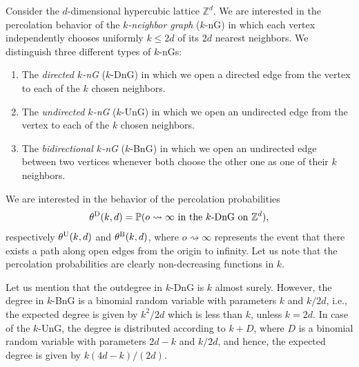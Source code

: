 \documentclass[oneside]{amsart}
\theoremstyle{definition}
\newcommand{\1}{\mathbbm{1}}
\newcommand{\0}{\mathbf{o}}
\numberwithin{equation}{section}
\begin{document}
Consider the $d$-dimensional hypercubic lattice $\mathbb Z^d$. We are interested in the percolation behavior of the {\em $k$-neighbor graph} ($k$-nG) in which each vertex independently chooses uniformly $k\le 2d$ of its $2d$ nearest neighbors. We distinguish three different types of $k$-nGs:
\begin{enumerate}
\item The {\em directed $k$-nG} ($k$-DnG) in which we open a directed edge from the vertex to each of the $k$ chosen neighbors. 
\item The {\em undirected $k$-nG} ($k$-UnG) in which we open an undirected edge from the vertex to each of the $k$ chosen neighbors.
\item The {\em bidirectional $k$-nG} ($k$-BnG) in which we open an undirected edge between two vertices whenever both choose the other one as one of their $k$ neighbors.
\end{enumerate}

We are interested in the behavior of the percolation probabilities 
\begin{equation}\label{thetaD}
\theta^{\rm D}(k,d)=\mathbb P(o\rightsquigarrow\infty \text{ in the $k$-DnG on $\mathbb Z^d$}),
\end{equation}
respectively $\theta^{\rm U}(k,d)$ and $\theta^{\rm B}(k,d)$, %
where $o\rightsquigarrow\infty$ represents the event that there exists a path along open edges from the origin to infinity. Let us note that the percolation probabilities are clearly non-decreasing functions in $k$. 

Let us mention that the outdegree in $k$-DnG is $k$ almost surely. However, the degree in $k$-BnG is a binomial random variable with parameters $k$ and $k/2d$, i.e., the expected degree is given by $k^2/2d$ which is less than $k$, unless $k=2d$. In case of the $k$-UnG, the degree is distributed according to $k+D$, where $D$ is a binomial random variable with parameters $2d-k$ and $k/2d$, and hence, the expected degree is given by $k(4d-k)/(2d)$.
\end{document}
